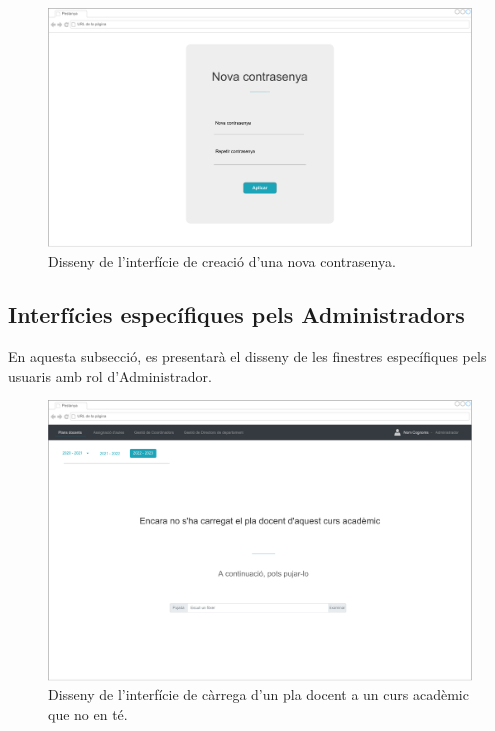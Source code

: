 \documentclass[a4paper,12pt]{ThesisStyle}
\begin{document}
\begin{figure}[H]
	\centering
	\includegraphics[width=\textwidth]{assets/interfaces/login/newPassword.pdf}
	\caption{\label{img:newPassword}Disseny de l'interfície de creació d'una nova contrasenya.}
\end{figure}

\subsection{Interfícies específiques pels Administradors}
\label{subsec:interficies_administradors}

En aquesta subsecció, es presentarà el disseny de les finestres específiques pels usuaris amb rol d'Administrador.

\begin{figure}[H]
	\centering
	\includegraphics[width=\textwidth]{assets/interfaces/administradors/plansDocents/mainNoCarregat.pdf}
	\caption{\label{img:plansDocents_mainNoCarregat}Disseny de l'interfície de càrrega d'un pla docent a un curs acadèmic que no en té.}
\end{figure}
\end{document}
